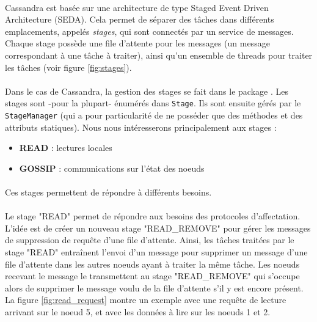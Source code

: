 \documentclass[12pt]{article}
\newcommand{\class}[1]{\texttt{#1}}
\begin{document}
\paragraph{} Cassandra est basée sur une architecture de type Staged Event Driven Architecture (SEDA). Cela permet de séparer des tâches dans différents emplacements, appelés \textit{stages}, qui sont connectés par un service de messages. Chaque stage possède une file d'attente pour les messages (un message correspondant à une tâche à traiter), ainsi qu'un ensemble de threads pour traiter les tâches (voir figure \ref{fig:stages}).

\paragraph{} Dans le cas de Cassandra, la gestion des stages se fait dans le package . Les stages sont -pour la plupart- énumérés dans \class{Stage}. Ils sont ensuite gérés par le \class{StageManager} (qui a pour particularité de ne posséder que des méthodes et des attributs statiques). Nous nous intéresserons principalement aux stages :

\begin{itemize}
	\item \textbf{READ} : lectures locales
	\item \textbf{GOSSIP} : communications sur l'état des noeuds
\end{itemize}
\paragraph{} Ces stages permettent de répondre à différents besoins.

\paragraph{} Le stage "READ" permet de répondre aux besoins des protocoles d'affectation. L'idée est de créer un nouveau stage "READ\_REMOVE" pour gérer les messages de suppression de requête d'une file d'attente. Ainsi, les tâches traitées par le stage "READ" entraînent l'envoi d'un message pour supprimer un message d'une file d'attente dans les autres noeuds ayant à traiter la même tâche. Les noeuds recevant le message le transmettent au stage "READ\_REMOVE" qui s'occupe alors de supprimer le message voulu de la file d'attente s'il y est encore présent. La figure \ref{fig:read_request} montre un exemple avec une requête de lecture arrivant sur le noeud 5, et avec les données à lire sur les noeuds 1 et 2.
\end{document}
